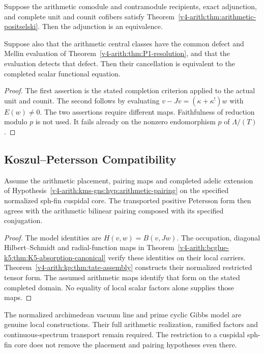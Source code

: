 \begin{proposition}
Suppose the arithmetic comodule and contramodule recipients,
exact adjunction, and complete unit and counit cofibers satisfy
Theorem~\ref{v4-arith:thm:arithmetic-positselski}.
Then the adjunction is an equivalence.

Suppose also that the arithmetic central classes have the
common defect and Mellin evaluation of
Theorem~\ref{v4-arith:thm:P1-resolution}, and that the evaluation
detects that defect. Then their cancellation is equivalent
to the completed scalar functional equation.
\end{proposition}
\begin{proof}
The first assertion is the stated completion criterion applied
to the actual unit and counit. The second follows by evaluating
\(v-Jv=(\kappa+\kappa^!)w\) with \(E(w)\ne0\).
The two assertions require different maps.
Faithfulness of reduction modulo \(p\) is not used. It fails
already on the nonzero endomorphism \(p\) of \(\Lambda/(T)\).
\end{proof}

\subsection{Koszul--Petersson Compatibility}
\label{v4-arith:w3-comparison-B:correction-26}

\begin{proposition}
Assume the arithmetic placement, pairing maps and completed adelic
extension of Hypothesis~\ref{v4-arith:kms-gns:hyp:arithmetic-pairing}
on the specified normalized sph-fin cuspidal core. The transported
positive Petersson form then agrees with the arithmetic bilinear
pairing composed with its specified conjugation.
\end{proposition}
\begin{proof}
The model identities are \(H(v,w)=B(v,Jw)\). The occupation,
diagonal Hilbert--Schmidt and radial-function maps in
Theorem~\ref{v4-arith:bcglue-k5:thm:K5-absorption-canonical}
verify these identities on their local carriers. Theorem~\ref{v4-arith:kp:thm:tate-assembly}
constructs their normalized restricted tensor form. The assumed
arithmetic maps identify that form on the stated completed domain.
No equality of local scalar factors alone supplies those maps.
\end{proof}
\begin{remark}
The normalized archimedean vacuum line and prime cyclic Gibbs model
are genuine local constructions. Their full arithmetic realization,
ramified factors and continuous-spectrum transport remain required.
The restriction to a cuspidal sph-fin core does not remove the
placement and pairing hypotheses even there.
\end{remark}

